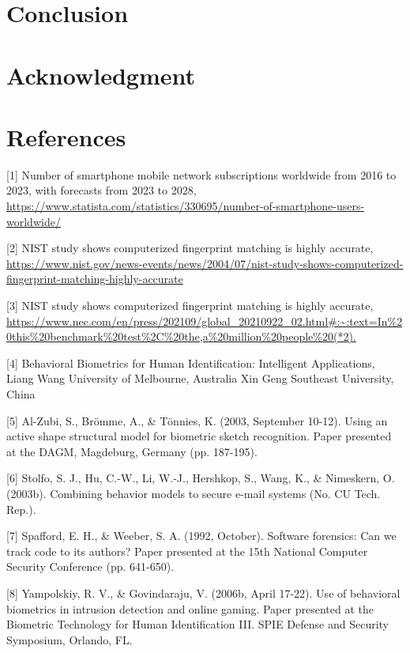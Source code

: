 \documentclass{article}
\begin{document}
\section{Conclusion}
\noindent
\section{Acknowledgment}


\newpage
\section{References}
\begin{raggedright}

[1] Number of smartphone mobile network subscriptions worldwide from 2016 to 2023, with forecasts from 2023 to 2028, \url{https://www.statista.com/statistics/330695/number-of-smartphone-users-worldwide/}

[2] NIST study shows computerized fingerprint matching is highly accurate, \url{https://www.nist.gov/news-events/news/2004/07/nist-study-shows-computerized-fingerprint-matching-highly-accurate}

[3] NIST study shows computerized fingerprint matching is highly accurate, \url{https://www.nec.com/en/press/202109/global_20210922_02.html#:~:text=In%20this%20benchmark%20test%2C%20the,a%20million%20people%20(*2).}

[4] Behavioral Biometrics for Human Identification: Intelligent Applications, Liang Wang University of Melbourne, Australia Xin Geng Southeast University, China

[5] Al-Zubi, S., Brömme, A., \& Tönnies, K. (2003, September 10-12). Using an active shape structural model for biometric sketch recognition. Paper presented at the DAGM, Magdeburg, Germany (pp. 187-195).

[6] Stolfo, S. J., Hu, C.-W., Li, W.-J., Hershkop, S., Wang, K., \& Nimeskern, O. (2003b). Combining behavior models to secure e-mail systems (No. CU Tech. Rep.). 

[7] Spafford, E. H., \& Weeber, S. A. (1992, October). Software forensics: Can we track code to its authors? Paper presented at the 15th National Computer Security Conference (pp. 641-650).

[8] Yampolskiy, R. V., \& Govindaraju, V. (2006b, April 17-22). Use of behavioral biometrics in intrusion detection and online gaming. Paper presented at the Biometric Technology for Human Identification III. SPIE Defense and Security Symposium, Orlando, FL.


\end{raggedright}
\end{document}
